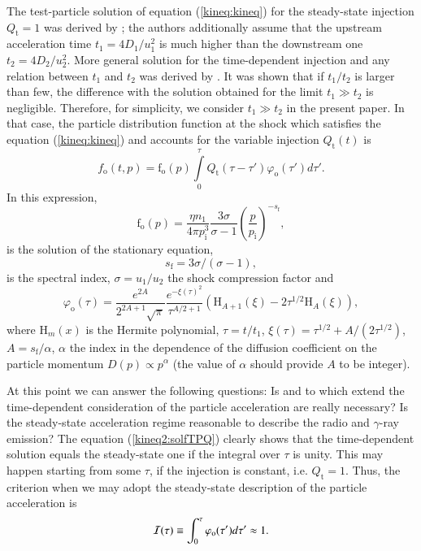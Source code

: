\documentclass{aa}
\newcommand\rs[1]{_\mathrm{#1}}
\begin{document}
The test-particle solution of equation (\ref{kineq:kineq}) for the steady-state injection $Q\rs{t}=1$ was derived by \citet{Drury-1983,Forman-Drury-1983}; the authors additionally assume that the upstream acceleration time $t_1=4D_1/u_1^2$ is much higher than the downstream one $t_2=4D_2/u_2^2$. More general solution for the time-dependent injection and any relation between $t_1$ and $t_2$ was derived by \citet{Petruk-Kopytko-2016}. It was shown that if $t_1/t_2$ is larger than few, the difference with the solution obtained for the limit $t_1\gg t_2$ is negligible. Therefore,  for simplicity, we consider $t_1\gg t_2$ in the present paper. 
In that case, the particle distribution function at the shock which satisfies the equation (\ref{kineq:kineq}) and accounts for the variable injection $Q\rs{t}(t)$ is \citep{Petruk-Kopytko-2016}
\begin{equation}
 f\rs{o}(t,p)=\mathrm{f}\rs{o}(p)\int\limits_{0}^{\tau} Q\rs{t}(\tau-\tau') \varphi\rs{o}(\tau') d\tau'.
\label{kineq2:solfTPQ}
\end{equation}
In this expression, 
\begin{equation}
 \mathrm{f}\rs{o}(p)=\frac{\eta n_1}{4\pi p\rs{i}^3}\frac{3\sigma}{\sigma-1}\left(\frac{p}{p\rs{i}}\right)^{-s\rs{f}},
 \label{kineq2:stationarysol}
\end{equation}
is the solution of the stationary equation, 
\begin{equation}
 s\rs{f}={3\sigma}/{(\sigma-1)},
\end{equation}
is the spectral index, $\sigma=u_1/u_2$ the shock compression factor and \citep{Forman-Drury-1983,Petruk-Kopytko-2016}
\begin{equation} 
 \varphi_{\mathrm{o}}(\tau)=\frac{e^{2A}}{2^{2A+1}\sqrt{\pi}}\frac{e^{-\xi(\tau)^2}}{\tau^{A/2+1}}
 \left(\mathrm{H}_{A+1}\left(\xi\right)
 -{2\tau^{1/2}}\mathrm{H}_{A}\left(\xi\right)
 \right),
 \label{kineq2:t1phi}
\end{equation}
where $\mathrm{H}_m(x)$ is the Hermite polynomial, $\tau=t/t_1$, $\xi(\tau)=\tau^{1/2}+A/(2\tau^{1/2})$, $A=s\rs{f}/\alpha$, $\alpha$ the index in the dependence of the diffusion coefficient on the particle momentum $D(p)\propto p^{\alpha}$ (the value of $\alpha$ should provide $A$ to be integer). 

At this point we can answer the following questions: Is and to which extend the time-dependent consideration of the particle acceleration are really necessary? Is the steady-state acceleration regime reasonable to describe the radio and $\gamma$-ray emission? 
The equation (\ref{kineq2:solfTPQ}) clearly shows that the time-dependent solution equals the steady-state one if the integral over $\tau$ is unity. 
This may happen starting from some $\tau$, if the injection is constant, i.e. $Q\rs{t}=1$. 
Thus, the criterion when we may adopt the steady-state description of the particle acceleration is
\begin{equation}
 {\cal I}(\tau)\equiv \int_{0}^{\tau} \varphi\rs{o}(\tau') d\tau' \approx 1. 
\end{equation}
\end{document}
